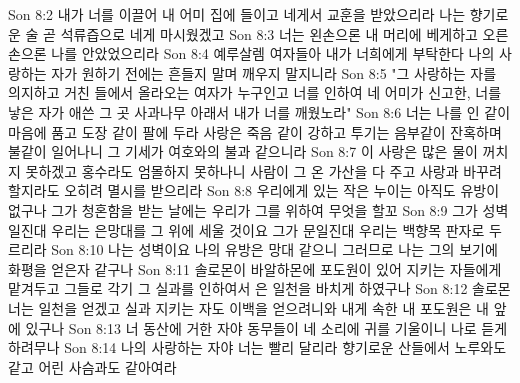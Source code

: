 Son 8:2  내가 너를 이끌어 내 어미 집에 들이고 네게서 교훈을 받았으리라 나는 향기로운 술 곧 석류즙으로 네게 마시웠겠고
Son 8:3  너는 왼손으론 내 머리에 베게하고 오른손으론 나를 안았었으리라
Son 8:4  예루살렘 여자들아 내가 너희에게 부탁한다 나의 사랑하는 자가 원하기 전에는 흔들지 말며 깨우지 말지니라
Son 8:5  "그 사랑하는 자를 의지하고 거친 들에서 올라오는 여자가 누구인고 너를 인하여 네 어미가 신고한, 너를 낳은 자가 애쓴 그 곳 사과나무 아래서 내가 너를 깨웠노라"
Son 8:6  너는 나를 인 같이 마음에 품고 도장 같이 팔에 두라 사랑은 죽음 같이 강하고 투기는 음부같이 잔혹하며 불같이 일어나니 그 기세가 여호와의 불과 같으니라
Son 8:7  이 사랑은 많은 물이 꺼치지 못하겠고 홍수라도 엄몰하지 못하나니 사람이 그 온 가산을 다 주고 사랑과 바꾸려 할지라도 오히려 멸시를 받으리라
Son 8:8  우리에게 있는 작은 누이는 아직도 유방이 없구나 그가 청혼함을 받는 날에는 우리가 그를 위하여 무엇을 할꼬
Son 8:9  그가 성벽일진대 우리는 은망대를 그 위에 세울 것이요 그가 문일진대 우리는 백향목 판자로 두르리라
Son 8:10  나는 성벽이요 나의 유방은 망대 같으니 그러므로 나는 그의 보기에 화평을 얻은자 같구나
Son 8:11  솔로몬이 바알하몬에 포도원이 있어 지키는 자들에게 맡겨두고 그들로 각기 그 실과를 인하여서 은 일천을 바치게 하였구나
Son 8:12  솔로몬 너는 일천을 얻겠고 실과 지키는 자도 이백을 얻으려니와 내게 속한 내 포도원은 내 앞에 있구나
Son 8:13  너 동산에 거한 자야 동무들이 네 소리에 귀를 기울이니 나로 듣게 하려무나
Son 8:14  나의 사랑하는 자야 너는 빨리 달리라 향기로운 산들에서 노루와도 같고 어린 사슴과도 같아여라


